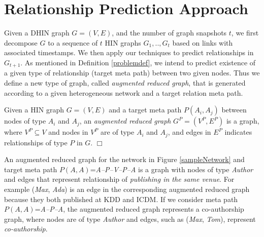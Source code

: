 \section{Relationship Prediction Approach}

Given a DHIN graph $G=(V,E)$, and the number of graph snapshots $t$, we first decompose $G$ to a sequence of $t$ HIN graphs ${G_1, .., G_t}$ based on links with associated timestamps. We then apply our techniques to predict relationships in $G_{t+1}$. As mentioned in Definition \ref{problemdef}, we intend to predict existence of a given type of relationship (target meta path) between two given nodes. Thus we define a new type of graph, called \textit{augmented reduced graph}, that is generated according to a given heterogeneous network and a target relation meta path. 


\begin{definition}\label{def:ARG}
Given a HIN graph $G=(V,E)$ and a target meta path $P(A_i,A_j)$ between nodes of type $A_i$ and $A_j$, an \textit{augmented reduced graph} $G^P=(V^P,E^P)$ is a graph, where $V^P \subseteq V$ and nodes in $V^P$ are of type $A_i$ and $A_j$, and edges in $E^P$ indicates relationships of type $P$ in $G$. $\Box$
\end{definition}


An augmented reduced graph for the network in Figure \ref{sampleNetwork} and target meta path $P(A,A)$=\textit{A--P--V--P--A} is a graph with nodes of type \textit{Author} and edges that represent relationship of \textit{publishing in the same venue}. For example (\textit{Max}, \textit{Ada}) is an edge in the corresponding augmented reduced graph because they both published at KDD and ICDM. If we consider meta path $P(A,A)$=\textit{A--P--A}, the augmented reduced graph represents a co-authorship graph, where nodes are of type \textit{Author} and edges, such as (\textit{Max}, \textit{Tom}), represent \textit{co-authorship}.  




